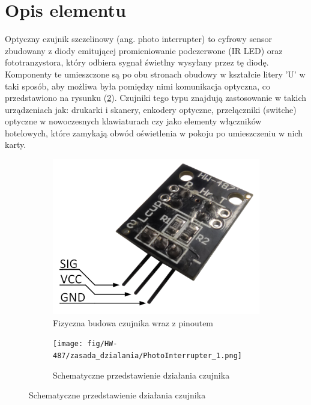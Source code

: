 \documentclass[11pt, a4paper]{article}
\author{Jakub Grzesiak}
\begin{document}
%
%
\newpage

\section*{Opis elementu}
Optyczny czujnik szczelinowy (ang. photo interrupter) to cyfrowy sensor zbudowany z diody emitującej promieniowanie podczerwone (IR LED) oraz fototranzystora, który odbiera sygnał świetlny wysyłany przez tę diodę. Komponenty te umieszczone są po obu stronach obudowy w kształcie litery 'U' w taki sposób, aby możliwa była pomiędzy nimi komunikacja optyczna, co przedstawiono na rysunku (\ref{fig:_zasada_dzialania_elementu}). Czujniki tego typu znajdują zastosowanie w takich urządzeniach jak: drukarki i skanery, enkodery optyczne, przełączniki (switche) optyczne w nowoczesnych klawiaturach czy jako elementy włączników hotelowych, które zamykają obwód oświetlenia w pokoju po umieszczeniu w nich karty.


\vspace{0.25cm}
\begin{figure}[h]
\centering
\begin{subfigure}{.5\textwidth}
\centering
\includegraphics[width=.7\linewidth]{fig/HW-487/zdj_modułu/reverse.png}
\caption{Fizyczna budowa czujnika wraz z pinoutem}
\label{fig:_zdjecie_elementu}
\end{subfigure}%
\begin{subfigure}{.5\textwidth}
\centering
\texttt{[image: fig/HW-487/zasada\_dzialania/PhotoInterrupter\_1.png]}
\caption{Schematyczne przedstawienie działania czujnika}
\label{fig:_zasada_dzialania_elementu}
\end{subfigure}
\label{fig:element}
\end{figure}
\vspace{0.25cm}
\end{document}
